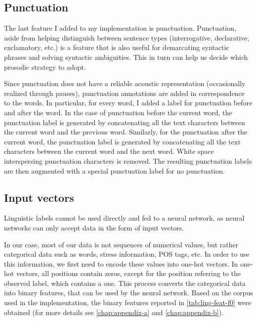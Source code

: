 \subsection{Punctuation}

The last feature I added to my implementation is punctuation. 
Punctuation, aside from helping distinguish between sentence types (interrogative, declarative, exclamatory, etc.) is a feature that is also useful for demarcating syntactic phrases and solving syntactic ambiguities. 
This in turn can help us decide which prosodic strategy to adopt. 

Since punctuation does not have a reliable acoustic representation (occasionally realized through pauses), punctuation annotations are added in correspondence to the words.
In particular, for every word, I added a label for punctuation before and after the word.
In the case of punctuation before the current word, the punctuation label is generated by concatenating all the text characters between the current word and the previous word.
Similarly, for the punctuation after the current word, the punctuation label is generated by concatenating all the text characters between the current word and the next word.
White space interspersing punctuation characters is removed.
The resulting punctuation labels are then augmented with a special punctuation label for no punctuation.


\subsection{Input vectors}
\label{input-vectors}

Linguistic labels cannot be used directly and fed to a neural network, as neural networks can only accept data in the form of input vectors.

In our case, most of our data is not sequences of numerical values, but rather categorical data such as words, stress information, \ac{POS} tags, etc.
In order to use this information, we first need to encode these values into one-hot vectors.
In one-hot vectors, all positions contain zeros, except for the position referring to the observed label, which contains a one.
This process converts the categorical data into binary features, that can be used by the neural network.
Based on the corpus used in the implementation, the binary features reported in \autoref{tab:ling-feat-f0} were obtained (for more details see \autoref{chap:appendix-a} and \autoref{chap:appendix-b}).


